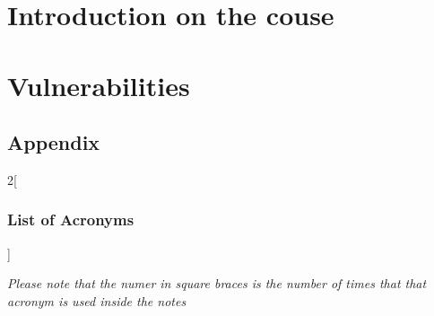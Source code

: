 \documentclass[11pt, a4paper, twoside, titlepage]{scrbook}
\begin{document}
\clearpage



\cleardoublepage

\tableofcontents
\cleardoublepage

\mainmatter



\cleardoublepage


\part{Introduction on the couse}





\part{Vulnerabilities}



\backmatter
\chapter{Appendix}


\clearpage
\setlength{\columnsep}{1cm}

\begin{multicols}{2}[\section{List of Acronyms}]
    \renewcommand{\glossarysection}[2][]{}
    \printglossary[type=\acronymtype]
\end{multicols}
\vfill
{\footnotesize\textit{Please note that the numer in square braces is the number of times that that acronym is used inside the notes}}
\end{document}
